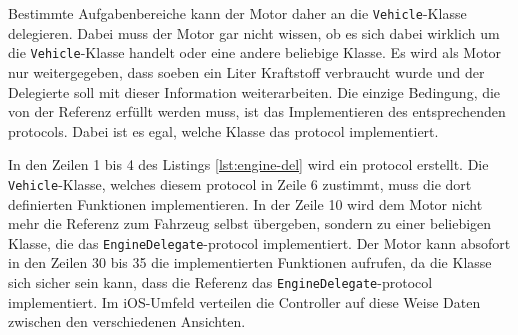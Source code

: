 Bestimmte Aufgabenbereiche kann der Motor daher an die \texttt{Vehicle}-Klasse delegieren.
Dabei muss der Motor gar nicht wissen, ob es sich dabei wirklich um die \texttt{Vehicle}-Klasse handelt oder eine andere beliebige Klasse.
Es wird als Motor nur weitergegeben, dass soeben ein Liter Kraftstoff verbraucht wurde und der Delegierte soll mit dieser Information weiterarbeiten.
Die einzige Bedingung, die von der Referenz erfüllt werden muss, ist das Implementieren des entsprechenden \Glspl{protocol}.
Dabei ist es egal, welche Klasse das \Gls{protocol} implementiert.

In den Zeilen 1 bis 4 des Listings \ref{lst:engine-del} wird ein \Gls{protocol} erstellt.
Die \texttt{Vehicle}-Klasse, welches diesem \Gls{protocol} in Zeile 6 zustimmt, muss die dort definierten Funktionen implementieren.
In der Zeile 10 wird dem Motor nicht mehr die Referenz zum Fahrzeug selbst übergeben, sondern zu einer beliebigen Klasse, die das \texttt{EngineDelegate}-\Gls{protocol} implementiert.
Der Motor kann absofort in den Zeilen 30 bis 35 die implementierten Funktionen aufrufen, da die Klasse sich sicher sein kann, dass die Referenz das \texttt{EngineDelegate}-\Gls{protocol} implementiert.
Im iOS-Umfeld verteilen die Controller auf diese Weise Daten zwischen den verschiedenen Ansichten.


